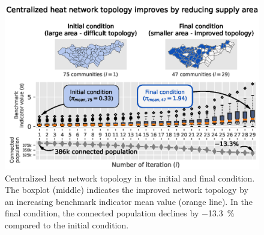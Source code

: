 \begin{figure}
	\centering
	\includegraphics[width=1\linewidth]{figures/4_Results/Fig_Boxplot/ext_boxplot.eps}
	\caption{Centralized heat network topology in the initial and final condition. The boxplot (middle) indicates the improved network topology by an increasing benchmark indicator mean value (orange line). In the final condition, the connected population declines by \SI{-13.3}{\%} compared to the initial condition.}
	\label{fig:res3}
\end{figure}

